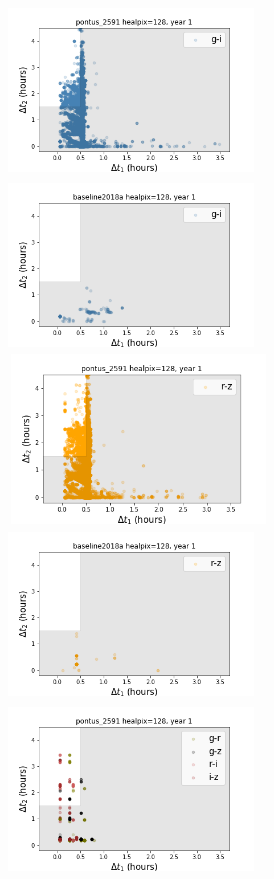\documentclass[letterpaper,longauthor,trackchanges,twocolumn,onecolappendix,sort&compress]{aastex62}
\begin{document}
\begin{figure}[!t]
\begin{center}
\includegraphics[width=6.5cm,height=4.5cm]{figures/3visits_pontus_2591_gi.png}
\includegraphics[width=6.5cm,height=4.5cm]{figures/3visits_baseline2018a_gi.png}
\includegraphics[width=6.91cm,height=4.5cm]{figures/3visits_pontus_2591_rz.png}
\includegraphics[width=6.5cm,height=4.5cm]{figures/3visits_baseline2018a_rz.png}
\includegraphics[width=6.5cm,height=4.5cm]{figures/3visits_pontus_2591_grgzriiz.png}

\end{center}
\end{figure}
\end{document}
